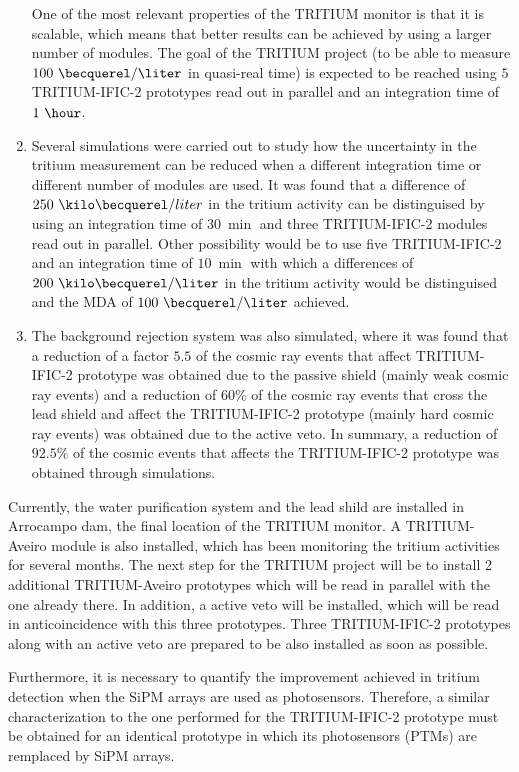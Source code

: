 \begin{enumerate}
One of the most relevant properties of the TRITIUM monitor is that it is scalable, which means that better results can be achieved by using a larger number of modules. The goal of the TRITIUM project (to be able to measure $100~\becquerel/\liter$ in quasi-real time) is expected to be reached using $5$ TRITIUM-IFIC-2 prototypes read out in parallel and an integration time of $1~\hour$.

\item{} Several simulations were carried out to study how the uncertainty in the tritium measurement can be reduced when a different integration time or different number of modules are used. It was found that a difference of $250~\kilo\becquerel/liter$ in the tritium activity can be distinguised by using an integration time of $30~\min$ and three TRITIUM-IFIC-2 modules read out in parallel. Other possibility would be to use five TRITIUM-IFIC-2 and an integration time of $10~\min$ with which a differences of $200~\kilo\becquerel/\liter$ in the tritium activity would be distinguised and the MDA of $100~\becquerel/\liter$ achieved.

\item{} The background rejection system was also simulated, where it was found that a reduction of a factor $5.5$ of the cosmic ray events that affect TRITIUM-IFIC-2 prototype was obtained due to the passive shield (mainly weak cosmic ray events) and a reduction of $60\%$ of the cosmic ray events that cross the lead shield and affect the TRITIUM-IFIC-2 prototype (mainly hard cosmic ray events) was obtained due to the active veto. In summary, a reduction of $92.5\%$ of the cosmic events that affects the TRITIUM-IFIC-2 prototype was obtained through simulations.

\end{enumerate}

Currently, the water purification system and the lead shild are installed in Arrocampo dam, the final location of the TRITIUM monitor. A TRITIUM-Aveiro module is also installed, which has been monitoring the tritium activities for several months. The next step for the TRITIUM project will be to install 2 additional TRITIUM-Aveiro prototypes which will be read in parallel with the one already there. In addition, a active veto will be installed, which will be read in anticoincidence with this three prototypes. Three TRITIUM-IFIC-2 prototypes along with an active veto are prepared to be also installed as soon as possible.

Furthermore, it is necessary to quantify the improvement achieved in tritium detection when the SiPM arrays are used as photosensors. Therefore, a similar characterization to the one performed for the TRITIUM-IFIC-2 prototype must be obtained for an identical prototype in which its photosensors (PTMs) are remplaced by SiPM arrays.


